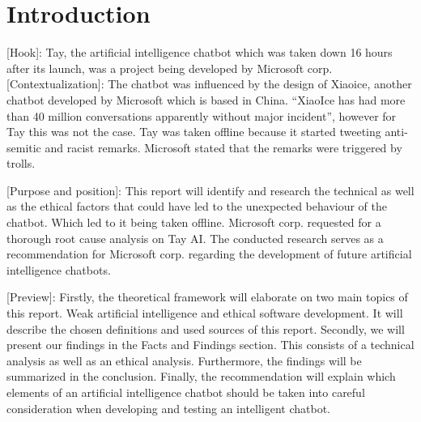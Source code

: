 \chapter{Introduction}

[Hook]: Tay, the artificial intelligence chatbot which was taken down 16 hours after its launch, was a project being developed by Microsoft corp. [Contextualization]: The chatbot was influenced by the design of Xiaoice, another chatbot developed by Microsoft which is based in China. “XiaoIce has had more than 40 million conversations apparently without major incident”, however for Tay this was not the case. Tay was taken offline because it started tweeting anti-semitic and racist remarks. Microsoft stated that the remarks were triggered by trolls.

[Purpose and position]: This report will identify and research the technical as well as the ethical factors that could have led to the unexpected behaviour of the chatbot. Which led to it being taken offline. Microsoft corp. requested for a thorough root cause analysis on Tay AI. The conducted research serves as a recommendation for Microsoft corp. regarding the development of future artificial intelligence chatbots.

[Preview]: Firstly, the theoretical framework will elaborate on two main topics of this report. Weak artificial intelligence and ethical software development. It will describe the chosen definitions and used sources of this report. Secondly, we will present our findings in the Facts and Findings section. This consists of a technical analysis as well as an ethical analysis. Furthermore, the findings will be summarized in the conclusion. Finally, the recommendation will explain which elements of an artificial intelligence chatbot should be taken into careful consideration when developing and testing an intelligent chatbot.

